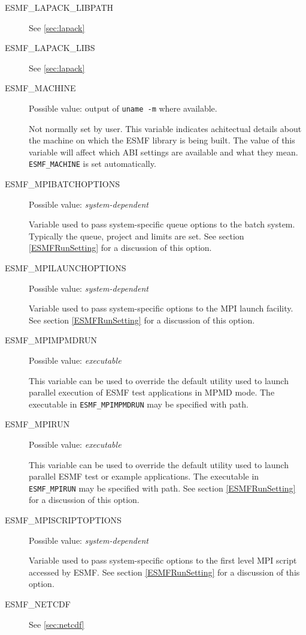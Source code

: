 \begin{description}
\item[ESMF\_LAPACK\_LIBPATH]
See \ref{sec:lapack}

\item[ESMF\_LAPACK\_LIBS]
See \ref{sec:lapack}

\item[ESMF\_MACHINE]
Possible value: output of {\tt uname -m} where available.

Not normally set by user. This variable indicates achitectual details about
the machine on which the ESMF library is being built. The value of this 
variable will affect which ABI settings are available and what they mean. 
{\tt ESMF\_MACHINE} is set automatically.

\item[ESMF\_MPIBATCHOPTIONS]
Possible value: {\em system-dependent}

Variable used to pass system-specific queue options to the batch system. 
Typically the queue, project and limits are set.
See section \ref{ESMFRunSetting} for a discussion of this option.

\item[ESMF\_MPILAUNCHOPTIONS]
Possible value: {\em system-dependent}

Variable used to pass system-specific options to the MPI launch facility.
See section \ref{ESMFRunSetting} for a discussion of this option.

\item[ESMF\_MPIMPMDRUN]
Possible value: {\em executable}

This variable can be used to override the default utility used to launch
parallel execution of ESMF test applications in MPMD mode. The executable in
{\tt ESMF\_MPIMPMDRUN} may be specified with path.

\item[ESMF\_MPIRUN]
Possible value: {\em executable}

This variable can be used to override the default utility used to launch
parallel ESMF test or example applications. The executable in {\tt ESMF\_MPIRUN}
may be specified with path. 
See section \ref{ESMFRunSetting} for a discussion of this option.

\item[ESMF\_MPISCRIPTOPTIONS]
Possible value: {\em system-dependent}

Variable used to pass system-specific options to the first level MPI script
accessed by ESMF.
See section \ref{ESMFRunSetting} for a discussion of this option.

\item[ESMF\_NETCDF]
See \ref{sec:netcdf}


\end{description}
